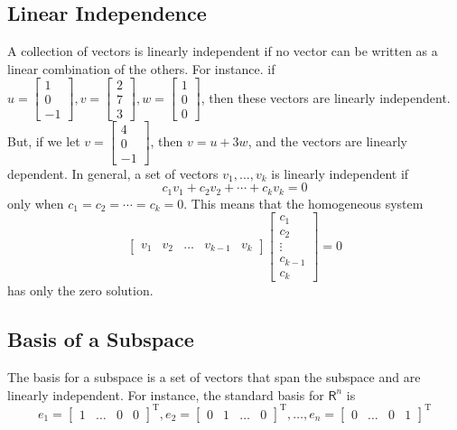 \documentclass[../main.tex]{subfiles}
\begin{document}
\subsection*{Linear Independence}
A collection of vectors is linearly independent if no vector can be written as a linear combination of the others. For instance. if $u=\left[\begin{array}{c}1 \\ 0 \\ -1\end{array}\right], v=\left[\begin{array}{l}2 \\ 7 \\ 3\end{array}\right], w=\left[\begin{array}{l}1 \\ 0 \\ 0\end{array}\right]$, then these vectors are linearly independent. But, if we let $v=\left[\begin{array}{c}4 \\ 0 \\ -1\end{array}\right]$, then
$v=u+3 w$, and the vectors are linearly dependent. In general, a set of vectors $v_{1}, \ldots, v_{k}$ is linearly independent if
$$
c_{1} v_{1}+c_{2} v_{2}+\cdots+c_{k} v_{k}=0
$$
only when $c_{1}=c_{2}=\cdots=c_{k}=0 .$ This means that the homogeneous system
$$
\left[\begin{array}{lllll}
v_{1} & v_{2} & \ldots & v_{k-1} & v_{k}
\end{array}\right]\left[\begin{array}{c}
c_{1} \\
c_{2} \\
\vdots \\
c_{k-1} \\
c_{k}
\end{array}\right]=0
$$
has only the zero solution.

\subsection*{Basis of a Subspace}
The basis for a subspace is a set of vectors that span the subspace and are linearly independent. For instance, the standard basis for $\mathsf{R}^{n}$ is
$$
e_{1}=\left[\begin{array}{llll}
1 & \ldots & 0 & 0
\end{array}\right]^{\mathrm{T}}, e_{2}=\left[\begin{array}{llll}
0 & 1 & \ldots & 0
\end{array}\right]^{\mathrm{T}}, \ldots, e_{n}=\left[\begin{array}{llll}
0 & \ldots & 0 & 1
\end{array}\right]^{\mathrm{T}}
$$
\end{document}
